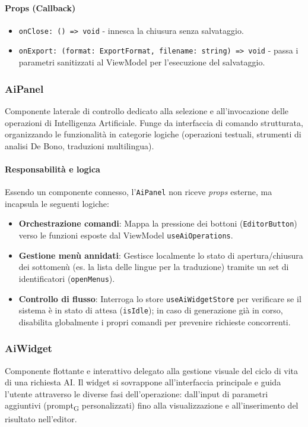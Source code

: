 \documentclass[11pt,a4paper]{article}
\newcommand{\gls}[1]{#1\textsubscript{G}}
\begin{document}
\paragraph{Props (Callback)}
\begin{itemize}
    \item \texttt{onClose: () => void} - innesca la chiusura senza salvataggio.
    \item \texttt{onExport: (format: ExportFormat, filename: string) => void} - passa i parametri sanitizzati al ViewModel per l'esecuzione del salvataggio.
\end{itemize}

\subsubsection{AiPanel}
Componente laterale di controllo dedicato alla selezione e all'invocazione delle operazioni di Intelligenza Artificiale. Funge da interfaccia di comando strutturata, organizzando le funzionalità in categorie logiche (operazioni testuali, strumenti di analisi De Bono, traduzioni multilingua).

\paragraph{Responsabilità e logica}
Essendo un componente connesso, l'\texttt{AiPanel} non riceve \textit{props} esterne, ma incapsula le seguenti logiche:
\begin{itemize}
    \item \textbf{Orchestrazione comandi}: Mappa la pressione dei bottoni (\texttt{EditorButton}) verso le funzioni esposte dal ViewModel \texttt{useAiOperations}.
    \item \textbf{Gestione menù annidati}: Gestisce localmente lo stato di apertura/chiusura dei sottomenù (es. la lista delle lingue per la traduzione) tramite un set di identificatori (\texttt{openMenus}).
    \item \textbf{Controllo di flusso}: Interroga lo store \texttt{useAiWidgetStore} per verificare se il sistema è in stato di attesa (\texttt{isIdle}); in caso di generazione già in corso, disabilita globalmente i propri comandi per prevenire richieste concorrenti.
\end{itemize}


\subsubsection{AiWidget}
Componente flottante e interattivo delegato alla gestione visuale del ciclo di vita di una richiesta AI. Il widget si sovrappone all'interfaccia principale e guida l'utente attraverso le diverse fasi dell'operazione: dall'input di parametri aggiuntivi (\gls{prompt} personalizzati) fino alla visualizzazione e all'inserimento del risultato nell'editor.
\end{document}
